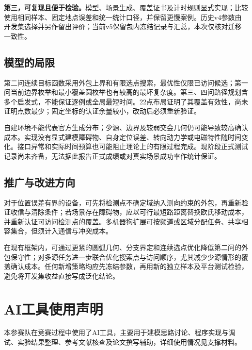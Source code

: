 \documentclass{JXUSTmodeling}
\begin{document}
\textbf{第三，可复现且便于检验。}模型、场景生成、覆盖证书及计时规则显式实现；比较使用相同样本、固定地点误差和统一统计口径，并保留更慢案例。历史v4参数由开发集选择并另作留出评价；当前v5保留包内冻结记录与汇总，本次仅核对迁移一致性。

\subsection{模型的局限}
第二问连续目标函数采用外包上界和有限选点搜索，最优性仅限已访问候选；第一问当前边界枚举和最小覆盖圆枚举也有较高的最坏复杂度。第三、四问路径规划含多个启发式，不能保证逐例或全局最短时间。22点布局证明了其覆盖有效性，尚未证明点数最少；固定坐标的认证余量较小，改动后必须重新验证。

自建环境不能代表官方生成分布；少源、边界及较弱交会几何仍可能导致较高确认成本。实现没有显式建模障碍物、自身定位误差、转向动力学或电磁特性随时间变化。接口异常和实际时间预算也可能阻止理论上的有限过程完成。现阶段正式测试记录尚未齐备，无法据此报告正式成绩或对真实场景成功率作统计保证。

\subsection{推广与改进方向}
对于位置误差有界的设备，可先将检测点不确定域纳入测向约束的外包，再重新验证收信与清除条件；若场景存在障碍物，应以可行最短路距离替换欧氏移动成本，并重新认证可访问检测点的覆盖。多机器狗扩展可按频道或区域分配任务、共享相容集合，但须计入通信与冲突成本。

在现有框架内，可通过更紧的圆弧几何、分支界定和连续选点优化降低第二问的外包保守性；对多源任务进一步联合优化搜索点与访问顺序，尤其减少少源情形的覆盖确认成本。任何新增策略均应先冻结参数，再用新的独立样本及平台测试检验，避免将开发集收益直接写成泛化结论。

\section*{AI工具使用声明}
本参赛队在竞赛过程中使用了AI工具，主要用于建模思路讨论、程序实现与调试、实验结果整理、参考文献核查及论文撰写辅助，详细使用情况见支撑材料。
\end{document}
